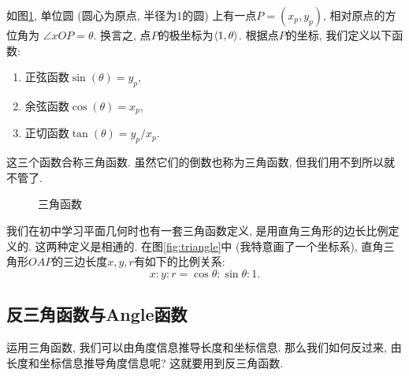 \begin{definition}[三角函数]
  如图\ref{fig:trig-func},
  单位圆 (圆心为原点, 半径为1的圆)
  上有一点$P=(x_p,y_p)$, 相对原点的方位角为
  $\angle{xOP}=\theta$.
  换言之, 点$P$的极坐标为$\braket{1,\theta}$.
  根据点$P$的坐标, 我们定义以下函数:

  \begin{enumerate}[label=(\alph*)]
    \item 正弦函数$\sin(\theta) = y_p$,
    \item 余弦函数$\cos(\theta) = x_p$,
    \item 正切函数$\tan(\theta) = y_p / x_p$.
  \end{enumerate}

  这三个函数合称三角函数.
  虽然它们的倒数也称为三角函数, 但我们用不到所以就不管了.
\end{definition}

\begin{figure}[htbp]
  \centering
  \caption{三角函数}
  \label{fig:trig-func}
\end{figure}

我们在初中学习平面几何时也有一套三角函数定义,
是用直角三角形的边长比例定义的.
这两种定义是相通的.
在图\ref{fig:triangle}中 (我特意画了一个坐标系),
直角三角形$OAP$的三边长度$x,y,r$有如下的比例关系:
\[x : y : r = \cos\theta : \sin\theta : 1.\]

\subsection{反三角函数与Angle函数}

运用三角函数, 我们可以由角度信息推导长度和坐标信息.
那么我们如何反过来, 由长度和坐标信息推导角度信息呢?
这就要用到反三角函数.

